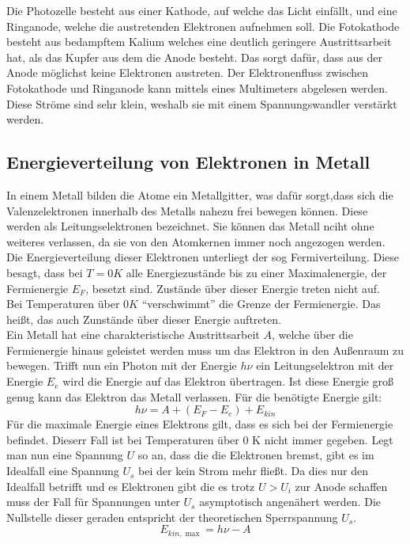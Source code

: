 Die Photozelle besteht aus einer Kathode, auf welche das Licht einfällt, und eine Ringanode, welche die austretenden Elektronen
aufnehmen soll. Die Fotokathode besteht aus bedampftem Kalium welches eine deutlich geringere Austrittsarbeit hat, als das
Kupfer aus dem die Anode besteht. Das sorgt dafür, dass aus der Anode möglichst keine Elektronen austreten.
Der Elektronenfluss zwischen Fotokathode und Ringanode kann mittels eines Multimeters abgelesen werden.
Diese Ströme sind sehr klein, weshalb sie mit einem Spannungswandler verstärkt werden.

\subsection{Energieverteilung von Elektronen in Metall}

In einem Metall bilden die Atome ein Metallgitter, was dafür sorgt,dass sich die Valenzelektronen innerhalb des Metalls
nahezu frei bewegen können. Diese werden als Leitungselektronen bezeichnet. Sie können das Metall nciht ohne weiteres verlassen,
da sie von den Atomkernen immer noch angezogen werden.\\
Die Energieverteilung dieser Elektronen unterliegt der sog Fermiverteilung.
Diese besagt, dass bei $T= 0K$ alle Energiezustände bis zu einer Maximalenergie, der Fermienergie $E_F$,
besetzt sind. Zustände über dieser Energie treten nicht auf.\\
Bei Temperaturen über $0K$ ``verschwimmt'' die Grenze der Fermienergie. Das heißt, das auch Zunstände
über dieser Energie auftreten.\\
Ein Metall hat eine charakteristische Austrittsarbeit $A$, welche über die Fermienergie hinaus geleistet werden muss um das Elektron in den Außenraum zu bewegen.
Trifft nun ein Photon mit der Energie $h \nu$ ein Leitungselektron mit der Energie $E_e$ wird die Energie auf das Elektron übertragen.
Ist diese Energie groß genug kann das Elektron das Metall verlassen. Für die benötigte Energie gilt:
\begin{equation}
    h \nu =  A + (E_F - E_e) + E_{kin}
\end{equation}
Für die maximale Energie eines Elektrons gilt, dass es sich bei der Fermienergie befindet. Dieserr Fall ist bei Temperaturen über 0 K
nicht immer gegeben. Legt man nun eine Spannung $U$ so an, dass die die Elektronen bremst, gibt es im Idealfall eine Spannung $U_s$ bei der kein
Strom mehr fließt. Da dies nur den Idealfall betrifft und es Elektronen gibt die es trotz $U> U_i$ zur Anode schaffen muss der Fall für Spannungen unter
$U_s$ asymptotisch angenähert werden. Die Nullstelle dieser geraden entspricht der theoretischen Sperrspannung $U_s$.
\begin{equation}
    E_{kin,\max}= h \nu - A
    \label{eq:Ekin}
\end{equation}

